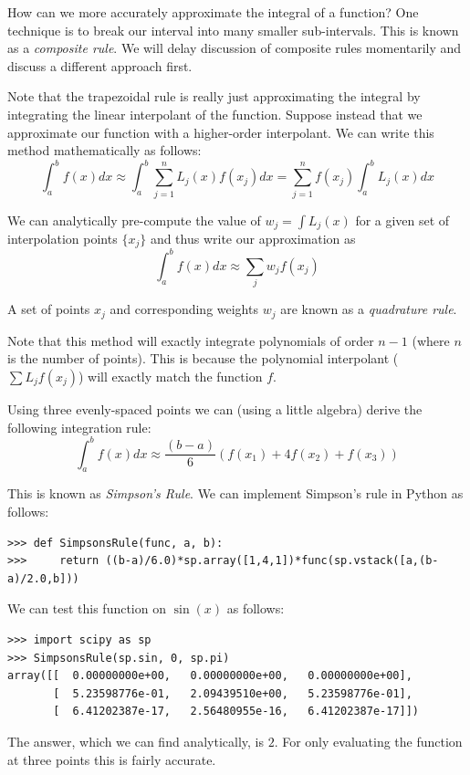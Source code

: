 How can we more accurately approximate the integral of a function?
One technique is to break our interval into many smaller sub-intervals.
This is known as a \emph{composite rule}.
We will delay discussion of composite rules momentarily and discuss a different approach first.

Note that the trapezoidal rule is really just approximating the integral by integrating the linear interpolant of the function.
Suppose instead that we approximate our function with a higher-order interpolant.
We can write this method mathematically as follows:
\[
\int_a^b f(x) dx \approx \int_a^b \sum_{j=1}^n L_j(x)f(x_j) dx = \sum_{j=1}^n f(x_j)\int_a^b L_j(x) dx
\]

We can analytically pre-compute the value of $w_j = \int L_j(x)$ for a given set of interpolation points $\{x_j\}$ and thus write our approximation as
\[
\int_a^b f(x) dx \approx \sum_j w_j f(x_j)
\]

A set of points $x_j$ and corresponding weights $w_j$ are known as a \emph{quadrature rule}.

Note that this method will exactly integrate polynomials of order $n-1$ (where $n$ is the number of points).
This is because the polynomial interpolant ($\sum L_j f(x_j)$) will exactly match the function $f$.

Using three evenly-spaced points we can (using a little algebra) derive the following integration rule:
\[
\int_a^b f(x) dx \approx \frac{(b-a)}{6}\left(f(x_1) + 4 f(x_2) + f(x_3)\right)
\]

This is known as \emph{Simpson's Rule}.
We can implement Simpson's rule in Python as follows:
\begin{lstlisting}
>>> def SimpsonsRule(func, a, b):
>>>     return ((b-a)/6.0)*sp.array([1,4,1])*func(sp.vstack([a,(b-a)/2.0,b]))
\end{lstlisting}

We can test this function on $\sin(x)$ as follows:
\begin{lstlisting}
>>> import scipy as sp
>>> SimpsonsRule(sp.sin, 0, sp.pi)
array([[  0.00000000e+00,   0.00000000e+00,   0.00000000e+00],
       [  5.23598776e-01,   2.09439510e+00,   5.23598776e-01],
       [  6.41202387e-17,   2.56480955e-16,   6.41202387e-17]])
\end{lstlisting}

The answer, which we can find analytically, is $2$.
For only evaluating the function at three points this is fairly accurate.

